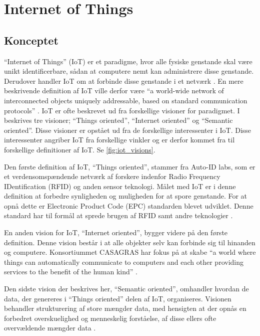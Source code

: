 \section{Internet of Things} %
\label{sec:internet_of_things}

\subsection{Konceptet}
\label{sub:iot_koncept}

\enquote{Internet of Things} (IoT) er et paradigme, hvor alle fysiske genstande skal være unikt identificerbare, sådan at computere nemt kan administrere disse genstande. Derudover handler IoT om at forbinde disse genstande i et netværk \cite{kopetz2011real}. En mere beskrivende definition af IoT ville derfor være \enquote{a world-wide network of interconnected objects uniquely addressable, based on standard communication protocols} \cite{iot_survey_2010}. IoT er ofte beskrevet ud fra forskellige visioner for paradigmet. I \cite{iot_survey_2010}  beskrives tre visioner; \enquote{Things oriented}, \enquote{Internet oriented} og \enquote{Semantic oriented}. Disse visioner er opstået ud fra de forskellige interessenter i IoT. Disse interessenter angriber IoT fra forskellige vinkler og er derfor kommet fra til forskellige definitioner af IoT. Se \cref{fig:iot_visions}.


Den første definition af IoT, \enquote{Things oriented}, stammer fra Auto-ID labs, som er et verdensomspændende netværk af forskere indenfor Radio Frequency IDentification (RFID) og anden sensor teknologi. Målet med IoT er i denne definition at forbedre synligheden og muligheden for at spore genstande. For at opnå dette er Electronic Product Code (EPC) standarden blevet udviklet. Denne standard har til formål at sprede brugen af RFID samt andre teknologier \cite{iot_survey_2010}.

En anden vision for IoT, \enquote{Internet oriented}, bygger videre på den første definition. Denne vision består i at alle objekter selv kan forbinde sig til hinanden og computere. Konsortiummet CASAGRAS har fokus på at skabe \enquote{a world where things can automatically communicate to computers and each other providing services to the benefit of the human kind} \cite{iot_survey_2010}.

Den sidste vision der beskrives her, \enquote{Semantic oriented}, omhandler hvordan de data, der genereres i \enquote{Things oriented} delen af IoT, organiseres. Visionen behandler strukturering af store mængder data, med hensigten at der opnås en forbedret overskuelighed og menneskelig forståelse, af disse ellers ofte overvældende mængder data \cite{iot_semantics_2012}.



